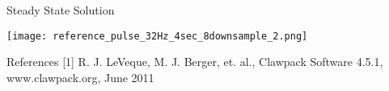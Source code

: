 \documentclass[unknownkeysallowed,final]{beamer}
\begin{document}
\begin{frame}{}
\begin{textblock}{17.3}
\begin{block}{\small{}}
\end{block}

\begin{block}{\small{Steady State Solution}}
\begin{center}
\texttt{[image: reference\_pulse\_32Hz\_4sec\_8downsample\_2.png]}
\end{center}
\end{block}

\begin{block}{\small{References}}
[1] R. J. LeVeque, M. J. Berger, et. al., Clawpack Software 4.5.1, www.clawpack.org, June 2011
\end{block}

	\end{textblock}

\end{frame}
\end{document}
